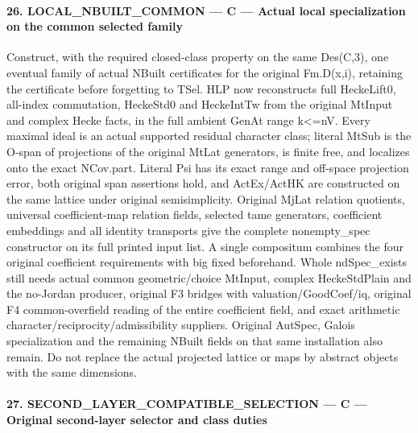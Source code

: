 


\paragraph{26. LOCAL\_\allowbreak NBUILT\_\allowbreak COMMON — C — Actual local specialization on the common selected family}

Construct, with the required closed-class property on the same Des(C,3), one eventual family of actual NBuilt certificates for the original Fm.D(x,i), retaining the certificate before forgetting to TSel. HLP now reconstructs full HeckeLift0, all-index commutation, HeckeStd0 and HeckeIntTw from the original MtInput and complex Hecke facts, in the full ambient GenAt range k<=nV. Every maximal ideal is an actual supported residual character class; literal MtSub is the O-span of projections of the original MtLat generators, is finite free, and localizes onto the exact NCov.part. Literal Psi has its exact range and off-space projection error, both original span assertions hold, and ActEx/ActHK are constructed on the same lattice under original semisimplicity. Original MjLat relation quotients, universal coefficient-map relation fields, selected tame generators, coefficient embeddings and all identity transports give the complete nonempty\_\allowbreak spec constructor on its full printed input list. A single compositum combines the four original coefficient requirements with big fixed beforehand. Whole ndSpec\_\allowbreak exists still needs actual common geometric/choice MtInput, complex HeckeStdPlain and the no-Jordan producer, original F3 bridges with valuation/GoodCoef/iq, original F4 common-overfield reading of the entire coefficient field, and exact arithmetic character/reciprocity/admissibility suppliers. Original AutSpec, Galois specialization and the remaining NBuilt fields on that same installation also remain. Do not replace the actual projected lattice or maps by abstract objects with the same dimensions.



\paragraph{27. SECOND\_\allowbreak LAYER\_\allowbreak COMPATIBLE\_\allowbreak SELECTION — C — Original second-layer selector and class duties}

